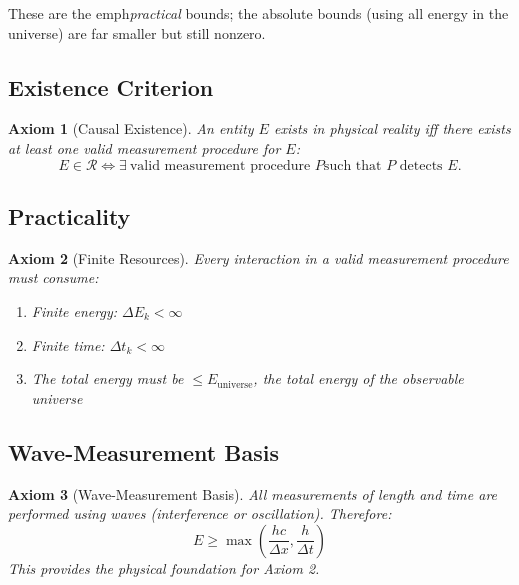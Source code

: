 \documentclass[aps,preprint,showpacs,showkeys]{revtex4}
\newtheorem{axiom}{Axiom}
\begin{document}
These are the \TEXTsymbol{\backslash}emph\emph{practical} bounds; the
absolute bounds (using all energy in the universe) are far smaller but still
nonzero.

\subsection{Existence Criterion}

\begin{axiom}[Causal Existence]
An entity $E$ exists in physical reality iff there exists at least one valid
measurement procedure for $E$: 
\begin{equation}
E \in \mathcal{R} \iff \exists\ \text{valid measurement procedure } P \text{
such that } P \text{ detects } E.
\end{equation}
\end{axiom}

\subsection{Practicality}

\begin{axiom}[Finite Resources]
Every interaction in a valid measurement procedure must consume:

\begin{enumerate}
\item Finite energy: $\Delta E_k < \infty$

\item Finite time: $\Delta t_k < \infty$

\item The total energy must be $\le E_{\text{universe}}$, the total energy
of the observable universe
\end{enumerate}
\end{axiom}

\subsection{Wave-Measurement Basis}

\begin{axiom}[Wave-Measurement Basis]
All measurements of length and time are performed using waves (interference
or oscillation). Therefore: 
\begin{equation}
E \ge \max\left(\frac{hc}{\Delta x}, \frac{h}{\Delta t}\right)
\end{equation}
This provides the physical foundation for Axiom 2.
\end{axiom}
\end{document}
